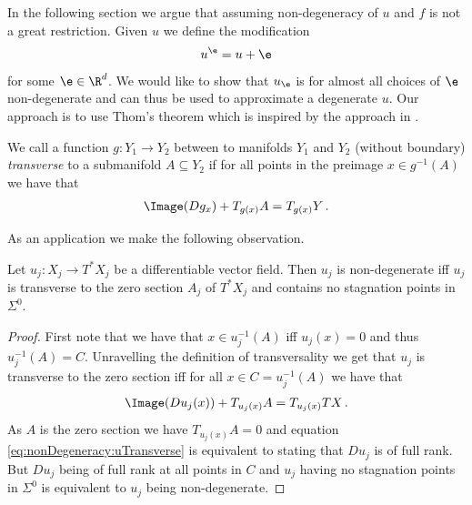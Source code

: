 In the following section we argue that assuming non-degeneracy 
of $u$ and $f$ is not a great restriction.
Given $u$ we define the modification
\begin{align}
  u^\e=u+\e\label{eq:nonDegeneracy:definitionUEps}
\end{align}
for some $\e\in\R^d$. We would like to show that $u_\e$ is for almost all choices of $\e$ non-degenerate and can 
thus be used to approximate a degenerate $u$.
Our approach is to use Thom's theorem which is inspired by the approach in \cite[Chapter 6]{Hirsch1994}.
\begin{definition}[Transversality]
  We call a function $g\colon Y_1\to Y_2$ between to manifolds $Y_1$ and $Y_2$ (without boundary)
  \emph{transverse} to a submanifold $A\subseteq Y_2$ if for all points in the 
  preimage $x\in g^{-1}(A)$ we have that
  \begin{align*}
    \Image(Dg_x)+T_{g(x)}A = T_{g(x)}Y\,.
  \end{align*}
\end{definition}
As an application we make the following observation.
\begin{proposition}\label{pr:nonDegeneracy:alternativeCharacterisation}
  Let $u_j\colon X_j\to T^*X_j$ be a differentiable vector field.
  Then $u_j$ is non-degenerate iff $u_j$ is transverse to the zero section $A_j$ of $T^*X_j$
  and contains no stagnation points in $\Sigma^0$.
\end{proposition}
\begin{proof}
  First note that we have that $x\in u_j^{-1}(A)$ iff $u_j(x)=0$ and thus $u_j^{-1}(A)=C$.
  Unravelling the definition of transversality we get that $u_j$ is transverse to the zero section iff for all $x\in C=u_j^{-1}(A)$
  we have that
  \begin{align}
    \Image(Du_j(x))+T_{u_j(x)}A = T_{u_j(x)}TX\,. \label{eq:nonDegeneracy:uTransverse}
  \end{align}
  As $A$ is the zero section we have $T_{u_j(x)}A=0$ and equation \eqref{eq:nonDegeneracy:uTransverse}
  is equivalent to stating that $Du_j$ is of full rank. But $Du_j$ being of full rank at all points
  in $C$ and $u_j$ having no stagnation points in $\Sigma^0$ is equivalent to $u_j$ being non-degenerate.
\end{proof}
